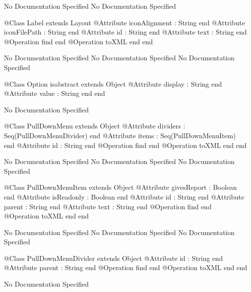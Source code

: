 No Documentation Specified
No Documentation Specified
\begin{Interface}
@Class Label extends Layout
  @Attribute iconAlignment : String end
  @Attribute iconFilePath : String end
  @Attribute id : String end
  @Attribute text : String end
  @Operation find end
  @Operation toXML end
end
\end{Interface}
No Documentation Specified
No Documentation Specified
No Documentation Specified
\begin{Interface}
@Class Option isabstract extends Object
  @Attribute display : String end
  @Attribute value : String end
end
\end{Interface}
No Documentation Specified
\begin{Interface}
@Class PullDownMenu extends Object
  @Attribute dividers : Seq(PullDownMenuDivider) end
  @Attribute items : Seq(PullDownMenuItem) end
  @Attribute id : String end
  @Operation find end
  @Operation toXML end
end
\end{Interface}
No Documentation Specified
No Documentation Specified
No Documentation Specified
\begin{Interface}
@Class PullDownMenuItem extends Object
  @Attribute givesReport : Boolean end
  @Attribute isReadonly : Boolean end
  @Attribute id : String end
  @Attribute parent : String end
  @Attribute text : String end
  @Operation find end
  @Operation toXML end
end
\end{Interface}
No Documentation Specified
No Documentation Specified
No Documentation Specified
\begin{Interface}
@Class PullDownMenuDivider extends Object
  @Attribute id : String end
  @Attribute parent : String end
  @Operation find end
  @Operation toXML end
end
\end{Interface}
No Documentation Specified
